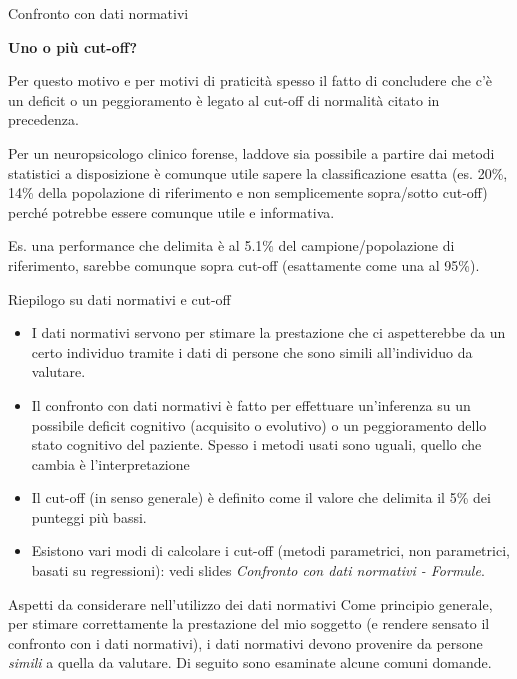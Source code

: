 \documentclass[
  ignorenonframetext,
  aspectratio=169,
]{beamer}
\begin{document}
\begin{frame}{Confronto con dati normativi}
\label{confronto-con-dati-normativi-11}
\begin{center}
  \textbf{Uno o più cut-off?}
\end{center}

Per questo motivo e per motivi di praticità spesso il fatto di
concludere che c'è un deficit o un peggioramento è legato al cut-off di
normalità citato in precedenza.

Per un neuropsicologo clinico forense, laddove sia possibile a partire
dai metodi statistici a disposizione è comunque utile sapere la
classificazione esatta (es. 20\%, 14\% della popolazione di riferimento
e non semplicemente sopra/sotto cut-off) perché potrebbe essere comunque
utile e informativa.

Es. una performance che delimita è al 5.1\% del campione/popolazione di
riferimento, sarebbe comunque sopra cut-off (esattamente come una al
95\%).
\end{frame}

\begin{frame}{Riepilogo su dati normativi e cut-off}
\label{riepilogo-su-dati-normativi-e-cut-off}
\small

\begin{itemize}
\item
  I dati normativi servono per stimare la prestazione che ci
  aspetterebbe da un certo individuo tramite i dati di persone che sono
  simili all'individuo da valutare.
\item
  Il confronto con dati normativi è fatto per effettuare un'inferenza su
  un possibile deficit cognitivo (acquisito o evolutivo) o un
  peggioramento dello stato cognitivo del paziente. Spesso i metodi
  usati sono uguali, quello che cambia è l'interpretazione
\item
  Il cut-off (in senso generale) è definito come il valore che delimita
  il 5\% dei punteggi più bassi.
\item
  Esistono vari modi di calcolare i cut-off (metodi parametrici, non
  parametrici, basati su regressioni): vedi slides \emph{Confronto con
  dati normativi - Formule}.
\end{itemize}
\end{frame}

\begin{frame}{Aspetti da considerare nell'utilizzo dei dati normativi}
\label{aspetti-da-considerare-nellutilizzo-dei-dati-normativi}
Come principio generale, per stimare correttamente la prestazione del
mio soggetto (e rendere sensato il confronto con i dati normativi), i
dati normativi devono provenire da persone \emph{simili} a quella da
valutare. Di seguito sono esaminate alcune comuni domande.
\end{frame}
\end{document}
